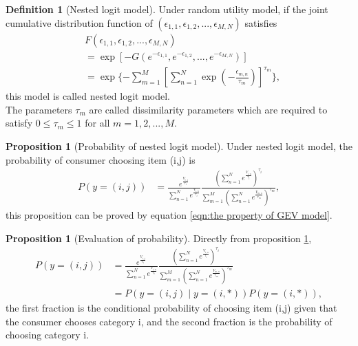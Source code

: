 \documentclass[12pt]{article}
\theoremstyle{definition}
\newtheorem{definition}{Definition}[section]
\newtheorem{prop}[theorem]{Proposition}
\begin{document}
\begin{definition}[Nested logit model]
    Under random utility model, if the joint cumulative distribution function of $(\epsilon_{1,1}, \epsilon_{1,2}, ..., \epsilon_{M,N})$ satisfies
    \begin{align*}
        &F(\epsilon_{1,1}, \epsilon_{1,2}, ..., \epsilon_{M,N})\\
        &=\exp[-G(e^{-\epsilon_{1,1}}, e^{-\epsilon_{1,2}}, ..., e^{-\epsilon_{M,N}})]\\
        &=\exp\{-\sum_{m=1}^{M}[\sum_{n=1}^{N}\exp(-\frac{\epsilon_{m,n}}{\tau_m})]^{\tau_m}\},
    \end{align*}
    this model is called nested logit model. \\
    The parameters $\tau_m$ are called dissimilarity parameters which are required to satisfy $0 \leq \tau_m \leq 1$ for all $m=1,2,...,M$.
\end{definition}

\begin{prop}[Probability of nested logit model]\label{prop:1}
    Under nested logit model, the probability of consumer choosing item (i,j) is
    \begin{align*}
        P(y=(i,j)) &= \frac{e^\frac{{V_{i,j}}}{\tau_i}}{\sum_{n=1}^{N} e^\frac{{V_{i,n}}}{\tau_i}} \frac{(\sum_{n=1}^{N} e^\frac{{V_{i,n}}}{\tau_i})^{\tau_i}}{\sum_{m=1}^{M}(\sum_{n=1}^{N} e^\frac{{V_{m,n}}}{\tau_m})^{\tau_m}},
    \end{align*}
    this proposition can be proved by equation \ref{eqn:the property of GEV model}.
\end{prop}

\begin{prop}[Evaluation of probability]\label{prop:2}
    Directly from proposition \ref{prop:1}, 
    \begin{align*}
        P(y=(i,j)) 
        &= \frac{e^\frac{{V_{i,j}}}{\tau_i}}{\sum_{n=1}^{N} e^\frac{{V_{i,n}}}{\tau_i}} \frac{(\sum_{n=1}^{N} e^\frac{{V_{i,n}}}{\tau_i})^{\tau_i}}{\sum_{m=1}^{M}(\sum_{n=1}^{N} e^\frac{{V_{m,n}}}{\tau_m})^{\tau_m}}\\
        &= P(y=(i,j) \mid y=(i,*))P(y=(i,*)),
    \end{align*}
    the first fraction is the conditional probability of choosing item (i,j) given that the consumer chooses category i, and the second fraction is the probability of choosing category i.
\end{prop}
\end{document}
